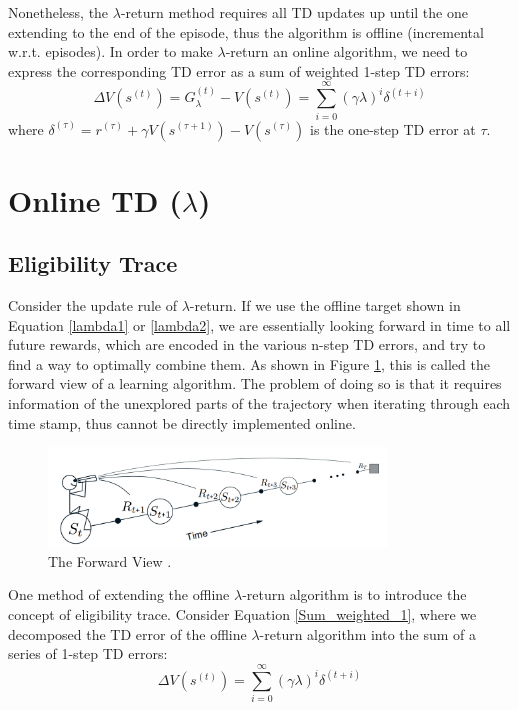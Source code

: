 \documentclass[11pt]{article}
\begin{document}
Nonetheless, the $\lambda$-return method requires all TD updates up until the one extending to the end of the episode, thus the algorithm is offline (incremental w.r.t. episodes). In order to make $\lambda$-return an online algorithm, we need to express the corresponding TD error as a sum of weighted 1-step TD errors:
\begin{equation}
    \Delta V\left(s^{(t)}\right) = G_\lambda^{(t)} - V\left(s^{(t)}\right) = \sum_{i=0}^\infty (\gamma\lambda)^i\delta^{(t+i)}
    \label{Sum_weighted_1}
\end{equation}
where $\delta^{(\tau)}=r^{(\tau)}+\gamma V\left(s^{(\tau+1)}\right)-V\left(s^{(\tau)}\right)$ is the one-step TD error at $\tau$.

\section{Online TD ($\lambda$)}

\subsection{Eligibility Trace}

Consider the update rule of $\lambda$-return. If we use the offline target shown in Equation \ref{lambda1} or \ref{lambda2}, we are essentially looking forward in time to all future rewards, which are encoded in the various n-step TD errors, and try to find a way to optimally combine them. As shown in Figure \ref{fig:forward_view}, this is called the forward view of a learning algorithm. The problem of doing so is that it requires information of the unexplored parts of the trajectory when iterating through each time stamp, thus cannot be directly implemented online.

\begin{figure}
    \centering
    \includegraphics[width=0.8\textwidth]{forward.PNG}
    \caption{The Forward View \cite{sutton_reinforcement_1998}.}
    \label{fig:forward_view}
\end{figure}

One method of extending the offline $\lambda$-return algorithm is to introduce the concept of eligibility trace. Consider Equation \ref{Sum_weighted_1}, where we decomposed the TD error of the offline $\lambda$-return algorithm into the sum of a series of 1-step TD errors:
\begin{equation}
    \Delta V\left(s^{(t)}\right) = \sum_{i=0}^\infty (\gamma\lambda)^i\delta^{(t+i)}
    \label{eq:sum_2}
\end{equation}
\end{document}
